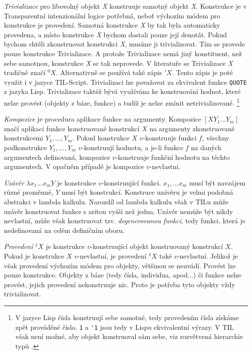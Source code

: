 \lstset{language=Lisp}
\textit{Trivializace} pro libovolný objekt \textit{X} konstruuje samotný objekt \textit{X}.
Konstrukce je v Transparentní intenzionální logice potřebná, neboť výchozím módem pro konstrukce
je provedení. Samotná konstrukce \textit{X} by tak byla automaticky provedena, a místo konstrukce
\textit{X} bychom dostali pouze její denotát. Pokud bychom chtěli zkonstruovat konstrukci
\textit{X}, musíme ji trivializovat. Tím se provede pouze konstrukce Trivializace. A protože
Trivializace nemá jiný konstituent, než sebe samotnou, konstrukce \textit{X} se tak neprovede.
V literatuře se Trivializace \textit{X} tradičně značí ${}^0X$. Alternativně se používá také zápis
$'X$. Tento zápis je poté využit i v jazyce TIL-Script. Trivializaci lze považovat za ekvivalent
funkce \lstinline{QUOTE} z jazyka Lisp. Trivializace taktéž bývá využívána ke konstruování hodnot,
které nelze provést (objekty z báze, funkce) a tudíž je nelze zmínit netrivializované.
\footnote{
    V jazyce Lisp čísla konstruují sebe samotné, tedy provedením čísla získáme zpět prováděné
    číslo. \lstinline{1} a \lstinline{'1} jsou tedy v Lispu ekvivalentní výrazy. V TIL však není
    možné, aby objekt konstruoval sám sebe, viz rozvětvená hierarchie typů .
}

\textit{Kompozice} je procedura aplikace funkce na argumenty. Kompozice $[X Y_1...Y_m]$ značí
aplikaci funkce konstruované konstrukcí $X$ na argumenty zkonstruované konstrukcemi $Y_1,...,Y_m$.
Pokud konstrukce $X$ $v$-konstruuje funkci $f$, všechny podkonstrukce $Y_1,...,Y_m$ $v$-konstruují
hodnotu, a je-li funkce $f$ na daných argumentech definovaná, kompozice $v$-konstruuje funkční
hodnotu na těchto argumentech. V opačném případě je kompozice $v$-nevlastní.

\textit{Uzávěr} $\lambda x_1...x_m Y$ je konstrukce $v$-konstruující funkci. $x_1,...x_m$ musí
být navzájem různé proměnné, $Y$ musí být konstrukcí. Konstruce uzávěru je velmi podobná abstrakci
v lambda kalkulu. Narozdíl od lambda kalkulu však v TILu může uzávěr konstruovat funkce s aritou
vyšší než jedna. Uzávěr nemůže být nikdy nevlastní, může však konstruovat tzv.
\textit{degenerovanou funkci}, tedy funkci, která je nedefinovaná na celém definičním oboru.

\textit{Provedení} ${}^1X$ je konstrukce $v$-konstruující objekt konstruovaný konstrukcí $X$.
Pokud je konstrukce $X$ $v$-nevlastní, je provedení ${}^1X$ také $v$-nevlastní. Jelikož je však
provedení výchozím módem pro objekty, většinou se neuvádí. Provést lze pouze konstrukce. Objekty
z báze (tedy čísla, individua, apod...) či funkce nelze provést, jejich provedení nekonstruuje nic.
Proto je potřeba tyto objekty vždy trivializovat.

